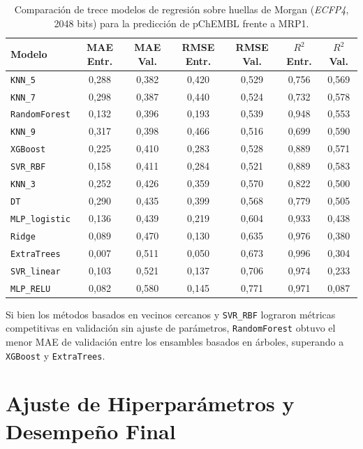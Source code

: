 \begin{table}[htbp]
\centering
\caption{Comparación de trece modelos de regresión sobre huellas de Morgan (\textit{ECFP4}, 2048 bits) para la predicción de pChEMBL frente a MRP1.}
\label{tab:ap_comparacion_pchembl}
\begin{tabular}{lcccccc}
\toprule
Modelo & MAE Entr. & MAE Val. & RMSE Entr. & RMSE Val. & $R^2$ Entr. & $R^2$ Val. \\
\midrule
\texttt{KNN\_5}        & 0,288 & 0,382 & 0,420 & 0,529 & 0,756 & 0,569 \\
\texttt{KNN\_7}        & 0,298 & 0,387 & 0,440 & 0,524 & 0,732 & 0,578 \\
\texttt{RandomForest}  & 0,132 & 0,396 & 0,193 & 0,539 & 0,948 & 0,553 \\
\texttt{KNN\_9}        & 0,317 & 0,398 & 0,466 & 0,516 & 0,699 & 0,590 \\
\texttt{XGBoost}       & 0,225 & 0,410 & 0,283 & 0,528 & 0,889 & 0,571 \\
\texttt{SVR\_RBF}      & 0,158 & 0,411 & 0,284 & 0,521 & 0,889 & 0,583 \\
\texttt{KNN\_3}        & 0,252 & 0,426 & 0,359 & 0,570 & 0,822 & 0,500 \\
\texttt{DT}            & 0,290 & 0,435 & 0,399 & 0,568 & 0,779 & 0,505 \\
\texttt{MLP\_logistic} & 0,136 & 0,439 & 0,219 & 0,604 & 0,933 & 0,438 \\
\texttt{Ridge}         & 0,089 & 0,470 & 0,130 & 0,635 & 0,976 & 0,380 \\
\texttt{ExtraTrees}    & 0,007 & 0,511 & 0,050 & 0,673 & 0,996 & 0,304 \\
\texttt{SVR\_linear}   & 0,103 & 0,521 & 0,137 & 0,706 & 0,974 & 0,233 \\
\texttt{MLP\_RELU}     & 0,082 & 0,580 & 0,145 & 0,771 & 0,971 & 0,087 \\
\bottomrule
\end{tabular}
\end{table}

Si bien los métodos basados en vecinos cercanos y \texttt{SVR\_RBF} lograron métricas competitivas en validación sin ajuste de parámetros, \texttt{RandomForest} obtuvo el menor MAE de validación entre los ensambles basados en árboles, superando a \texttt{XGBoost} y \texttt{ExtraTrees}.

\section{Ajuste de Hiperparámetros y Desempeño Final}
\label{sec:ap_rf_final}

